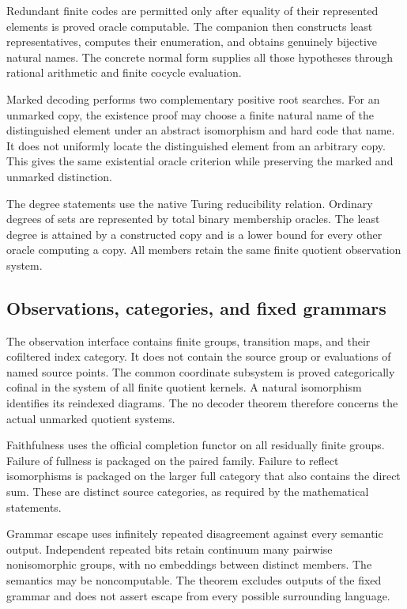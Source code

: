 Redundant finite codes are permitted only after equality of their represented elements is proved oracle computable. The companion then constructs least representatives, computes their enumeration, and obtains genuinely bijective natural names. The concrete normal form supplies all those hypotheses through rational arithmetic and finite cocycle evaluation.

Marked decoding performs two complementary positive root searches. For an unmarked copy, the existence proof may choose a finite natural name of the distinguished element under an abstract isomorphism and hard code that name. It does not uniformly locate the distinguished element from an arbitrary copy. This gives the same existential oracle criterion while preserving the marked and unmarked distinction.

The degree statements use the native Turing reducibility relation. Ordinary degrees of sets are represented by total binary membership oracles. The least degree is attained by a constructed copy and is a lower bound for every other oracle computing a copy. All members retain the same finite quotient observation system.

\subsection{Observations, categories, and fixed grammars}
The observation interface contains finite groups, transition maps, and their cofiltered index category. It does not contain the source group or evaluations of named source points. The common coordinate subsystem is proved categorically cofinal in the system of all finite quotient kernels. A natural isomorphism identifies its reindexed diagrams. The no decoder theorem therefore concerns the actual unmarked quotient systems.

Faithfulness uses the official completion functor on all residually finite groups. Failure of fullness is packaged on the paired family. Failure to reflect isomorphisms is packaged on the larger full category that also contains the direct sum. These are distinct source categories, as required by the mathematical statements.

Grammar escape uses infinitely repeated disagreement against every semantic output. Independent repeated bits retain continuum many pairwise nonisomorphic groups, with no embeddings between distinct members. The semantics may be noncomputable. The theorem excludes outputs of the fixed grammar and does not assert escape from every possible surrounding language.

